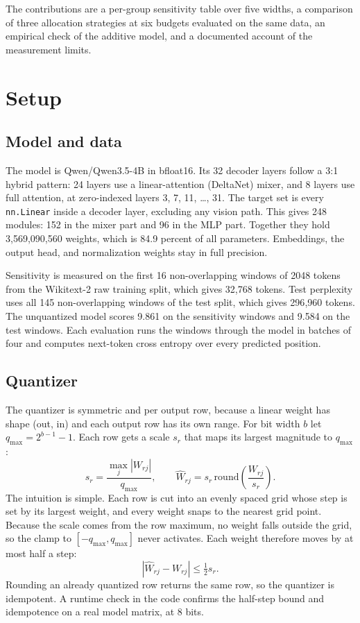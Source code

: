 \documentclass[11pt]{article}
\begin{document}
The contributions are a per-group sensitivity table over five widths, a comparison of three allocation strategies at six budgets evaluated on the same data, an empirical check of the additive model, and a documented account of the measurement limits.

\section{Setup}

\subsection{Model and data}

The model is Qwen/Qwen3.5-4B in bfloat16. Its 32 decoder layers follow a 3:1 hybrid pattern: 24 layers use a linear-attention (DeltaNet) mixer, and 8 layers use full attention, at zero-indexed layers 3, 7, 11, \ldots, 31. The target set is every \texttt{nn.Linear} inside a decoder layer, excluding any vision path. This gives 248 modules: 152 in the mixer part and 96 in the MLP part. Together they hold 3{,}569{,}090{,}560 weights, which is 84.9 percent of all parameters. Embeddings, the output head, and normalization weights stay in full precision.

Sensitivity is measured on the first 16 non-overlapping windows of 2048 tokens from the Wikitext-2 raw training split, which gives 32{,}768 tokens. Test perplexity uses all 145 non-overlapping windows of the test split, which gives 296{,}960 tokens. The unquantized model scores 9.861 on the sensitivity windows and 9.584 on the test windows. Each evaluation runs the windows through the model in batches of four and computes next-token cross entropy over every predicted position.

\subsection{Quantizer}

The quantizer is symmetric and per output row, because a linear weight has shape (out, in) and each output row has its own range. For bit width $b$ let $q_{\max} = 2^{b-1} - 1$. Each row gets a scale $s_r$ that maps its largest magnitude to $q_{\max}$:
\begin{equation}
s_r = \frac{\max_j |W_{rj}|}{q_{\max}}, \qquad
\hat W_{rj} = s_r \,\mathrm{round}\!\left(\frac{W_{rj}}{s_r}\right).
\end{equation}
The intuition is simple. Each row is cut into an evenly spaced grid whose step is set by its largest weight, and every weight snaps to the nearest grid point. Because the scale comes from the row maximum, no weight falls outside the grid, so the clamp to $[-q_{\max}, q_{\max}]$ never activates. Each weight therefore moves by at most half a step:
\begin{equation}
|\hat W_{rj} - W_{rj}| \le \tfrac{1}{2} s_r.
\end{equation}
Rounding an already quantized row returns the same row, so the quantizer is idempotent. A runtime check in the code confirms the half-step bound and idempotence on a real model matrix, at 8 bits.
\end{document}
